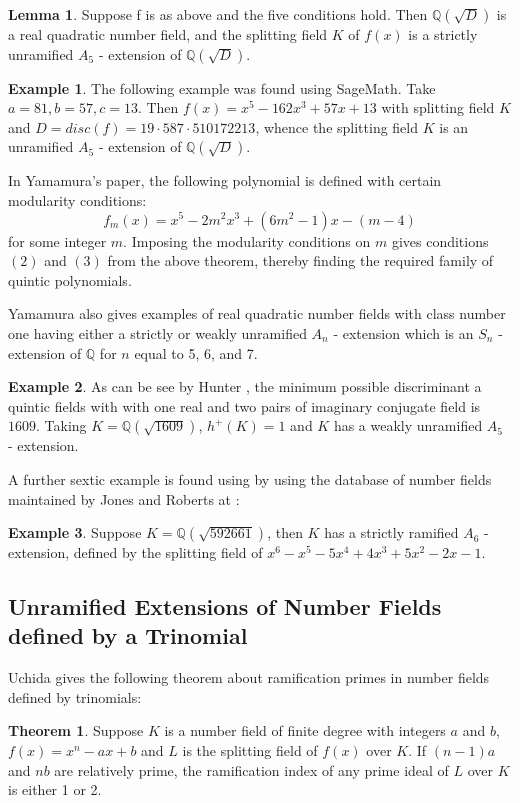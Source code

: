 \documentclass[12pt]{extarticle}
\newcommand{\Q}{\mathbb{Q}}
\newcommand{\<}{\langle}
\renewcommand{\>}{\rangle}
\theoremstyle{definition}
\newtheorem{theorem}{Theorem}
\newtheorem*{example}{Example}
\newtheorem{lemma}{Lemma}
\begin{document}
\begin{lemma}
Suppose f is as above and the five conditions hold. Then $\Q(\sqrt{D})$ is a real quadratic number field, and the splitting field $K$ of $f(x) $ is a strictly unramified $A_5$ - extension of $\Q(\sqrt{D})$. 
\end{lemma}
\begin{example}
    The following example was found using SageMath. Take $a=81,b=57,c=13$. Then $f(x) = x^5-162x^3+57x+13$ with splitting field $K$ and $D= disc(f) = 19 \cdot 587 \cdot 510172213$, whence the splitting field $K$ is an unramified $A_5$ - extension of $\Q(\sqrt{D})$. 
\end{example}
In Yamamura's paper, the following polynomial is defined with certain modularity conditions: 
\begin{equation}
f_m(x)= x^5-2m^2x^3+(6m^2-1)x-(m-4)
\end{equation}
  for some integer $m$. Imposing the modularity conditions on $m$ gives conditions $(2)$ and $(3)$ from the above theorem, thereby finding the required family of quintic polynomials. \par
Yamamura also gives examples of real quadratic number fields with class number one having either a strictly or weakly unramified $A_n$ - extension which is an $S_n$ - extension of $\Q$ for $n$ equal to 5, 6, and 7. 
\begin{example}
As can be see by Hunter \cite{HUNTER}, the minimum possible discriminant a quintic fields with with one real and two pairs of imaginary conjugate field is $1609$. 
Taking $K=\Q(\sqrt{1609})$, $h^{+}(K)=1$ and $K$ has a weakly unramified $A_5$ - extension.
\end{example}
A further sextic example is found using by using the database of number fields maintained by Jones and Roberts at \cite{JONE2}:
\begin{example}
Suppose $K=\Q(\sqrt{592661})$, then $K$ has a strictly ramified $A_6$ - extension, defined by the splitting field of  $x^6 - x^5 - 5x^4 + 4x^3 + 5x^2 - 2x - 1$. 
\end{example}


\subsection{Unramified Extensions of Number Fields defined by a Trinomial}

Uchida \cite{uchida1970} gives the following theorem about ramification primes in number fields defined by trinomials:
\begin{theorem}
Suppose $K$ is a number field of finite degree with integers $a$ and $b$, $f(x) = x^n-ax+b$ and $L$ is the splitting field of $f(x)$ over $K$. If $(n-1)a$ and $nb$ are relatively prime, the ramification index of any prime ideal of $L$ over $K$ is either 1 or 2. 
\end{theorem}
\end{document}
